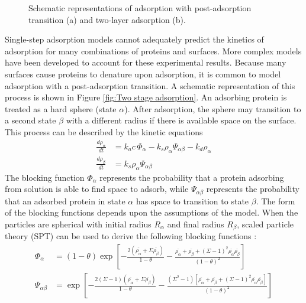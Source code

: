 %
\begin{figure}

\caption{\label{fig:Adsorption Schematics}Schematic representations of adsorption
with post-adsorption transition (a) and two-layer adsorption (b).}


%
\end{figure}
Single-step adsorption models cannot adequately predict the kinetics
of adsorption for many combinations of proteins and surfaces. More
complex models have been developed to account for these experimental
results. Because many surfaces cause proteins to denature upon adsorption,
it is common to model adsorption with a post-adsorption transition.
A schematic representation of this process is shown in Figure \ref{fig:Two stage adsorption}.
An adsorbing protein is treated as a hard sphere (state $\alpha$).
After adsorption, the sphere may transition to a second state $\beta$
with a different radius if there is available space on the surface.
This process can be described by the kinetic equations\begin{align}
\frac{d\rho_{\alpha}}{dt} & =k_{a}c\,\Phi_{\alpha}-k_{s}\rho_{\alpha}\Psi_{\alpha\beta}-k_{d}\rho_{\alpha}\label{eq:Adsorption Transition Kinetics}\\
\frac{d\rho_{\beta}}{dt} & =k_{s}\rho_{\alpha}\Psi_{\alpha\beta}\label{eq:Adsorption Transition Kinetics 2}\end{align}
The blocking function $\Phi_{\alpha}$ represents the probability
that a protein adsorbing from solution is able to find space to adsorb,
while $\Psi_{\alpha\beta}$ represents the probability that an adsorbed
protein in state $\alpha$ has space to transition to state $\beta$.
The form of the blocking functions depends upon the assumptions of
the model. When the particles are spherical with initial radius $R_{\alpha}$
and final radius $R_{\beta}$, scaled particle theory (SPT) can be
used to derive the following blocking functions \cite{Brusatori1999}:
\begin{align}
\Phi_{\alpha} & =\left(1-\theta\right)\exp\left[-\frac{2\left(\overline{\rho_{\alpha}}+\Sigma\overline{\rho_{\beta}}\right)}{1-\theta}-\frac{\overline{\rho_{\alpha}}+\overline{\rho_{\beta}}+\left(\Sigma-1\right)^{2}\overline{\rho_{\alpha}}\overline{\rho_{\beta}}}{\left(1-\theta\right)^{2}}\right]\label{eq:Phi_alpha}\\
\Psi_{\alpha\beta} & =\exp\left[-\frac{2\left(\Sigma-1\right)\left(\overline{\rho_{\alpha}}+\Sigma\overline{\rho_{\beta}}\right)}{1-\theta}-\frac{\left(\Sigma^{2}-1\right)\left[\overline{\rho_{\alpha}}+\overline{\rho_{\beta}}+\left(\Sigma-1\right)^{2}\overline{\rho_{\alpha}}\overline{\rho_{\beta}}\right]}{\left(1-\theta\right)^{2}}\right]\label{eq:Psi_alpha_beta}\end{align}
